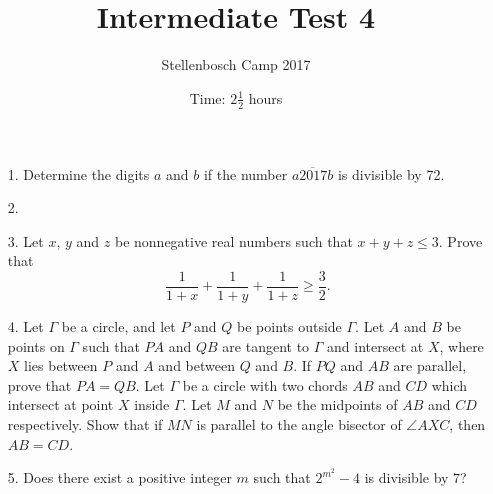 \documentclass[12pt]{article}
\title{Intermediate Test 4}
\author{Stellenbosch Camp 2017}
\date{Time: $2\frac{1}{2}$ hours}
\begin{document}
 \maketitle

\begin{enumerate}

\item[1.] %
Determine the digits $a$ and $b$ if the number $\overline{a2017b}$ is divisible by 72.


\item[2.] %


\item[3.] %
Let $x$, $y$ and $z$ be nonnegative real numbers such that $x+y+z \leq 3$. Prove that
	\[ \frac{1}{1+x} +\frac{1}{1+y} +\frac{1}{1+z} \geq \frac{3}{2}. \]


\item[4.] %
Let $\Gamma$ be a circle, and let $P$ and $Q$ be points outside $\Gamma$. Let $A$ and $B$ be points on $\Gamma$ such that $PA$ and $QB$ are tangent to $\Gamma$ and intersect at $X$, where $X$ lies between $P$ and $A$ and between $Q$ and $B$. If $PQ$ and $AB$ are parallel, prove that $PA = QB$.
Let $\Gamma$ be a circle with two chords $AB$ and $CD$ which intersect at point $X$ inside $\Gamma$. Let $M$ and $N$ be the midpoints of $AB$ and $CD$ respectively. Show that if $MN$ is parallel to the angle bisector of $\angle AXC$, then $AB = CD$.
 

\item[5.] %
Does there exist a positive integer $m$ such that $2^{m^2} - 4$ is divisible by $7$?


\end{enumerate}
\end{document}
